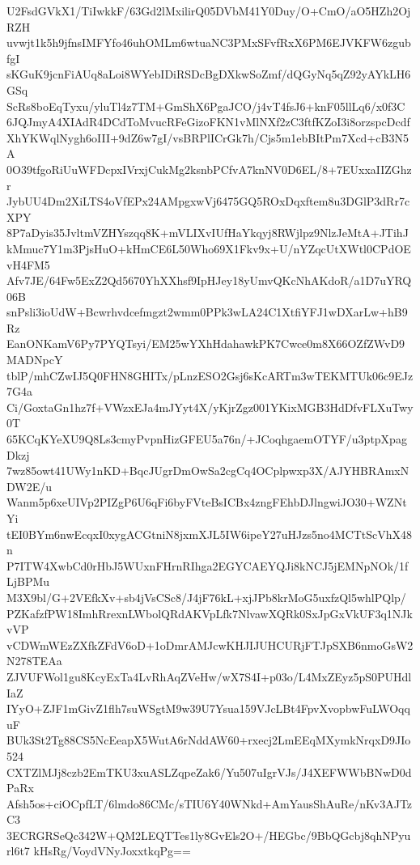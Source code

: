 U2FsdGVkX1/TiIwkkF/63Gd2lMxilirQ05DVbM41Y0Duy/O+CmO/aO5HZh2OjRZH
uvwjt1k5h9jfnsIMFYfo46uhOMLm6wtuaNC3PMxSFvfRxX6PM6EJVKFW6zgubfgI
sKGuK9jcnFiAUq8aLoi8WYebIDiRSDcBgDXkwSoZmf/dQGyNq5qZ92yAYkLH6GSq
ScRs8boEqTyxu/yluTl4z7TM+GmShX6PgaJCO/j4vT4fsJ6+knF05llLq6/x0f3C
6JQJmyA4XIAdR4DCdToMvucRFeGizoFKN1vMlNXf2zC3ftfKZoI3i8orzspcDcdf
XhYKWqlNygh6oIII+9dZ6w7gI/vsBRPlICrGk7h/Cjs5m1ebBItPm7Xcd+cB3N5A
0O39tfgoRiUuWFDcpxIVrxjCukMg2ksnbPCfvA7knNV0D6EL/8+7EUxxaIIZGhzr
JybUU4Dm2XiLTS4oVfEPx24AMpgxwVj6475GQ5ROxDqxftem8u3DGlP3dRr7cXPY
8P7aDyis35JvltmVZHYszqq8K+mVLIXvIUfHaYkqyj8RWjlpz9NlzJeMtA+JTihJ
kMmuc7Y1m3PjsHuO+kHmCE6L50Who69X1Fkv9x+U/nYZqcUtXWtl0CPdOEvH4FM5
Afv7JE/64Fw5ExZ2Qd5670YhXXhsf9IpHJey18yUmvQKcNhAKdoR/a1D7uYRQ06B
snPsli3ioUdW+Bcwrhvdcefmgzt2wmm0PPk3wLA24C1XtfiYFJ1wDXarLw+hB9Rz
EanONKamV6Py7PYQTsyi/EM25wYXhHdahawkPK7Cwce0m8X66OZfZWvD9MADNpcY
tblP/mhCZwIJ5Q0FHN8GHITx/pLnzESO2Gsj6sKcARTm3wTEKMTUk06c9EJz7G4a
Ci/GoxtaGn1hz7f+VWzxEJa4mJYyt4X/yKjrZgz001YKixMGB3HdDfvFLXuTwy0T
65KCqKYeXU9Q8Ls3cmyPvpnHizGFEU5a76n/+JCoqhgaemOTYF/u3ptpXpagDkzj
7wz85owt41UWy1nKD+BqcJUgrDmOwSa2cgCq4OCplpwxp3X/AJYHBRAmxNDW2E/u
Wanm5p6xeUIVp2PIZgP6U6qFi6byFVteBsICBx4zngFEhbDJlngwiJO30+WZNtYi
tEI0BYm6nwEcqxI0xygACGtniN8jxmXJL5IW6ipeY27uHJzs5no4MCTtScVhX48n
P7ITW4XwbCd0rHbJ5WUxnFHrnRIhga2EGYCAEYQJi8kNCJ5jEMNpNOk/1fLjBPMu
M3X9bl/G+2VEfkXv+sb4jVsCSc8/J4jF76kL+xjJPb8krMoG5uxfzQl5whlPQlp/
PZKafzfPW18ImhRrexnLWbolQRdAKVpLfk7NlvawXQRk0SxJpGxVkUF3q1NJkvVP
vCDWmWEzZXfkZFdV6oD+1oDmrAMJcwKHJIJUHCURjFTJpSXB6nmoGsW2N278TEAa
ZJVUFWol1gu8KcyExTa4LvRhAqZVeHw/wX7S4I+p03o/L4MxZEyz5pS0PUHdlIaZ
IYyO+ZJF1mGivZ1flh7suWSgtM9w39U7Ysua159VJcLBt4FpvXvopbwFuLWOqquF
BUk3St2Tg88CS5NcEeapX5WutA6rNddAW60+rxecj2LmEEqMXymkNrqxD9JIo524
CXTZlMJj8czb2EmTKU3xuASLZqpeZak6/Yu507uIgrVJs/J4XEFWWbBNwD0dPaRx
Afsh5os+ciOCpfLT/6lmdo86CMc/sTIU6Y40WNkd+AmYausShAuRe/nKv3AJTzC3
3ECRGRSeQc342W+QM2LEQTTes1ly8GvEls2O+/HEGbc/9BbQGcbj8qhNPyurl6t7
kHsRg/VoydVNyJoxxtkqPg==
